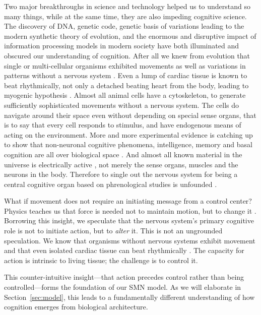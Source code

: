 Two major breakthroughs in science and technology helped us to understand so many things, while at the same time, they are also impeding cognitive science. The discovery of DNA, genetic code, genetic basis of variations leading to the modern synthetic theory of evolution, and the enormous and disruptive impact of information processing models in modern society have both illuminated and obscured our understanding of cognition. After all we knew from evolution that single or multi-cellular organisms exhibited movements as well as variations in patterns without a nervous system \citep{llinas2002vortex}. Even a lump of cardiac tissue is known to beat rhythmically, not only a detached beating heart from the body, leading to myogenic hypothesis \citep{landecker2007culturing}. Almost all animal cells have a cytoskeleton, to generate sufficiently sophisticated movements without a nervous system. The cells do navigate around their space even without depending on special sense organs, that is to say that every cell responds to stimulus, and have endogenous means of acting on the environment. More and more experimental evidence is catching up to show that non-neuronal cognitive phenomena, intelligence, memory and basal cognition are all over biological space \citep{Levin2023, biomimetics-Levin2023}. And almost all known material in the universe is electrically active \citep{Peratt1996plasma}, not merely the sense organs, muscles and the neurons in the body. Therefore to single out the nervous system for being a central cognitive organ based on phrenological studies is unfounded \citep{anderson2014phrenology}.

What if movement does not require an initiating message from a control center? Physics teaches us that force is needed not to maintain motion, but to change it \cite{newton1687principia}. Borrowing this insight, we speculate that the nervous system's primary cognitive role is not to initiate action, but to \textit{alter} it. This is not an ungrounded speculation. We know that organisms without nervous systems exhibit movement and that even isolated cardiac tissue can beat rhythmically \citep{llinas2002vortex, landecker2007culturing}. The capacity for action is intrinsic to living tissue; the challenge is to control it.

This counter-intuitive insight—that action precedes control rather than being controlled—forms the foundation of our SMN model. As we will elaborate in Section~\ref{sec:model}, this leads to a fundamentally different understanding of how cognition emerges from biological architecture.

